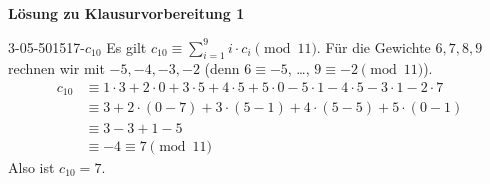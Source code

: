 \textbf{Lösung zu Klausurvorbereitung 1}

\begin{loesung}
3-05-501517-$c_{10}$
Es gilt $c_{10} \equiv \sum_{i=1}^{9} i \cdot c_i \pmod{11}$. Für die Gewichte $6, 7, 8, 9$ rechnen wir mit $-5, -4, -3, -2$ (denn $6 \equiv -5$, \dots, $9 \equiv -2 \pmod{11}$).
\begin{align*}
c_{10} &\equiv 1 \cdot 3 + 2 \cdot 0 + 3 \cdot 5 + 4 \cdot 5 + 5 \cdot 0 - 5 \cdot 1 - 4 \cdot 5 - 3 \cdot 1 - 2 \cdot 7\\
&\equiv 3 + 2 \cdot (0-7) + 3 \cdot (5-1) + 4 \cdot (5-5) + 5 \cdot (0-1)\\
&\equiv 3 - 3 + 1 - 5\\
&\equiv -4 \equiv 7 \pmod{11}
\end{align*}
Also ist $c_{10} = 7$.
\end{loesung}

